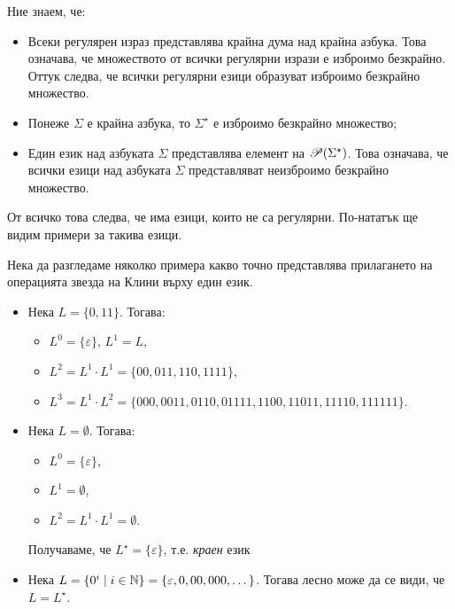 \begin{remark}
  Ние знаем, че:
  \begin{itemize}
  \item
    Всеки регулярен израз представлява крайна дума над крайна азбука.
    Това означава, че множеството от всички регулярни изрази е изброимо безкрайно.
    Оттук следва, че всички регулярни езици образуват изброимо безкрайно множество.
  \item 
    Понеже $\Sigma$ е крайна азбука, то $\Sigma^\star$ е изброимо безкрайно множество;
  \item
    Един език над азбуката $\Sigma$ представлява елемент на $\mathscr{P}(\Sigma^\star)$.
    Това означава, че всички езици над азбуката $\Sigma$ представляват неизброимо безкрайно множество.
  \end{itemize}
  От всичко това следва, че има езици, които не са регулярни.
  По-нататък ще видим примери за такива езици.
\end{remark}

\begin{example}
  Нека да разгледаме няколко примера какво точно представлява прилагането
  на операцията звезда на Клини върху един език.
  \begin{itemize}
  \item 
    Нека $L = \{0,11\}$. Тогава:
    \begin{itemize}
    \item 
      $L^0 = \{\varepsilon\}$, $L^1 = L$,
    \item
      $L^2 = L^1\cdot L^1 = \{00,011,110,1111\}$,
    \item
      $L^3 = L^1\cdot L^2 = \{000,0011,0110,01111,1100,11011,11110,111111\}$.
    \end{itemize}
  \item
    Нека $L = \emptyset$.
    Тогава:
    \begin{itemize}
    \item 
      $L^0 = \{\varepsilon\}$,
    \item
      $L^1 = \emptyset$,
    \item
      $L^2 = L^1 \cdot L^1 = \emptyset$.
    \end{itemize}    
    Получаваме, че $L^\star = \{\varepsilon\}$, т.е. {\em краен} език
  \item
    Нека $L = \{0^i\mid i \in \mathbb{N}\} = \{\varepsilon, 0, 00, 000, \dots\}$.
    Тогава лесно може да се види, че $L = L^\star$.
  \end{itemize}
\end{example}

